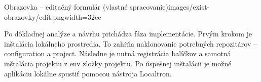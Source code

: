 {Obrazovka -- editačný formulár (vlastné spracovanie)}{images/exist-obrazovky/edit.png}{width=32cc} 

%
%
%
%
%
%
%
%
%

Po dôkladnej analýze a návrhu prichádza fáza implementácie. Prvým krokom je inštalácia lokálneho prostredia. To zahŕňa naklonovanie potrebných repozitárov -- configuration a project. Následne je nutná registrácia balíčkov a samotná inštalácia projektu z env zložky projektu. Po úspešnej inštalácii je možné aplikáciu lokálne spustiť pomocou nástroja Localtron.

